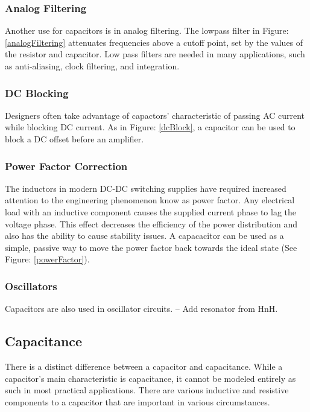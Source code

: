 \subsubsection{Analog Filtering}

Another use for capacitors is in analog filtering. The lowpass filter in Figure: \ref{analogFiltering} attenuates frequencies above a cutoff point, set by the values of the resistor and capacitor. Low pass filters are needed in many applications, such as anti-aliasing, clock filtering, and integration.


\subsubsection{DC Blocking}

Designers often take advantage of capactors' characteristic of passing AC current while blocking DC current. As in Figure: \ref{dcBlock}, a capacitor can be used to block a DC offset before an amplifier. 


\subsubsection{Power Factor Correction}

The inductors in modern DC-DC switching supplies have required increased attention to the engineering phenomenon know as power factor. Any electrical load with an inductive component causes the supplied current phase to lag the voltage phase. This effect decreases the efficiency of the power distribution and also has the ability to cause stability issues. A capacacitor can be used as a simple, passive way to move the power factor back towards the ideal state (See Figure: \ref{powerFactor}). \cite{cui_powerFactor}



\subsubsection{Oscillators}
Capacitors are also used in oscillator circuits. -- Add resonator from HnH.

\subsection{Capacitance}

There is a distinct difference between a capacitor and capacitance. While a capacitor's main characteristic is capacitance, it cannot be modeled entirely as such in most practical applications. There are various inductive and resistive components to a capacitor that are important in various circumstances.

